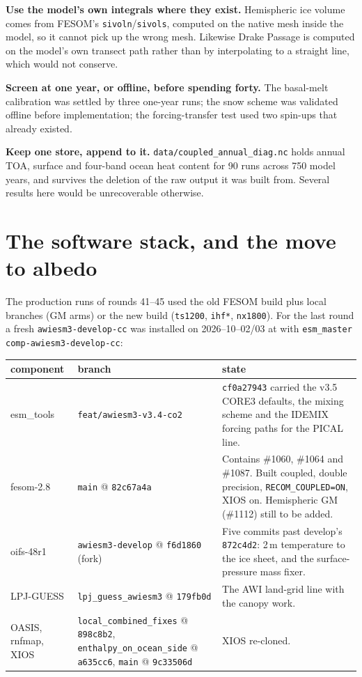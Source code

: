 \documentclass[10pt]{article}
\begin{document}
\textbf{Use the model's own integrals where they exist.} Hemispheric ice volume comes from
FESOM's \texttt{sivoln}/\texttt{sivols}, computed on the native mesh inside the model, so it
cannot pick up the wrong mesh. Likewise Drake Passage is computed on the model's own transect
path rather than by interpolating to a straight line, which would not conserve.

\textbf{Screen at one year, or offline, before spending forty.} The basal-melt calibration
was settled by three one-year runs; the snow scheme was validated offline before
implementation; the forcing-transfer test used two spin-ups that already existed.

\textbf{Keep one store, append to it.} \texttt{data/coupled\_annual\_diag.nc} holds annual
TOA, surface and four-band ocean heat content for 90 runs across 750 model years, and
survives the deletion of the raw output it was built from. Several results here would be
unrecoverable otherwise.

\section{The software stack, and the move to albedo}\label{sec:stack}

The production runs of rounds 41--45 used the old FESOM build plus local branches (GM arms) or the
new build (\texttt{ts1200}, \texttt{ihf*}, \texttt{nx1800}). For the last round a fresh
\texttt{awiesm3-develop-cc} was installed on 2026--10--02/03 at
 with \texttt{esm\_master
comp-awiesm3-develop-cc}:

\begin{center}\small
\begin{tabular}{p{2.3cm}p{4.0cm}p{9.1cm}}
\toprule
component & branch & state \\
\midrule
esm\_tools & \texttt{feat/awiesm3-v3.4-co2} & \texttt{cf0a27943} carried the v3.5 CORE3
defaults, the mixing scheme and the IDEMIX forcing paths for the PICAL line. \\
fesom-2.8 & \texttt{main} @ \texttt{82c67a4a} & Contains \#1060, \#1064 and \#1087. Built coupled,
double precision, \texttt{RECOM\_COUPLED=ON}, XIOS on. Hemispheric GM (\#1112) still to be added. \\
oifs-48r1 & \texttt{awiesm3-develop} @ \texttt{f6d1860} (fork) & Five commits past develop's
\texttt{872c4d2}: 2\,m temperature to the ice sheet, and the surface-pressure mass fixer. \\
LPJ-GUESS & \texttt{lpj\_guess\_awiesm3} @ \texttt{179fb0d} & The AWI land-grid line with the
canopy work. \\
OASIS, rnfmap, XIOS & \texttt{local\_combined\_fixes} @ \texttt{898c8b2},
\texttt{enthalpy\_on\_ocean\_side} @ \texttt{a635cc6}, \texttt{main} @ \texttt{9c33506d} & XIOS
re-cloned. \\
\bottomrule
\end{tabular}
\end{center}
\end{document}
